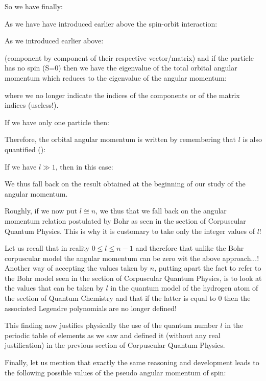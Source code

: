 	So we have finally:
	
	As we have have introduced earlier above the spin-orbit interaction:
	
	As we introduced earlier above:
	
	(component by component of their respective vector/matrix) and if the particle has no spin (S=0) then we have the eigenvalue of the total orbital angular momentum which reduces to the eigenvalue of the angular momentum:
	
	where we no longer indicate the indices of the components or of the matrix indices (useless!).
	
	If we have only one particle then:
	
	Therefore, the orbital angular momentum is written by remembering  that $l$ is also quantified ():
	
	If we have $l\gg 1$, then in this case:
	
	We thus fall back on the result obtained at the beginning of our study of the angular momentum.
	
	Roughly, if we now put $l\cong n$, we thus that we fall back on the angular momentum relation postulated by Bohr as seen in the section of Corpuscular Quantum Physics. This is why it is customary to take only the integer values of $l$!
	
	\begin{tcolorbox}[title=Remark,colframe=black,arc=10pt]
	Let us recall that in reality $0\le l \le n-1$ and therefore that unlike the Bohr corpuscular model the angular momentum can be zero wit the above approach...! Another way of accepting the values taken by $n$, putting apart the fact to refer to the Bohr model seen in the section of Corpuscular Quantum Physics, is to look at the values that can be taken by $l$ in the quantum model of the hydrogen atom of the section of Quantum Chemistry and that if the latter is equal to $0$ then the associated Legendre polynomials are no longer defined!
	\end{tcolorbox}
	This finding now justifies physically the use of the quantum number $l$ in the periodic table of elements as we saw and defined it  (without any real justification) in the previous section of Corpuscular Quantum Physics.

	Finally, let us mention that exactly the same reasoning and development leads to the following possible values of the pseudo angular momentum of spin:
	
